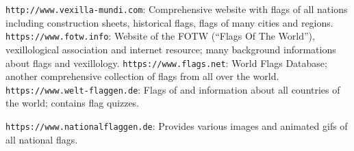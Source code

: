 \documentclass[11pt,a4paper,headsepline,fleqn]{scrreprt}
\begin{document}
{
\raggedright
\def\web#1{{\color{emphcolor}\texttt{#1}}: }
\def\txt#1{#1}
\def\bibname{Links}

\begin{thebibliography}{88}
\web{http://www.vexilla-mundi.com}
\txt{Comprehensive website with flags of all nations including construction
     sheets, historical flags, flags of many cities and regions.}
\web{https://www.fotw.info}
\txt{Website of the FOTW (``Flags Of The World''), vexillological association
 and internet resource; many background informations about flags and vexillology.}
\web{https://www.flags.net}
\txt{World Flags Database; another comprehensive collection of flags
from all over the world.}
\web{https://www.welt-flaggen.de}
\txt{Flags of and information about all countries of the world;
contains flag quizzes.}

\web{https://www.nationalflaggen.de}
\txt{Provides various images and animated gifs of all national flags.}
\end{thebibliography}
}
\end{document}
